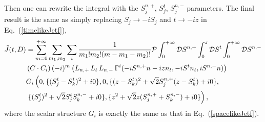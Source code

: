 \documentclass[a4paper,11pt]{article}
\begin{document}
Then one can rewrite the integral with the $S^{n,+}_{j}$, $S^{t}_j$, $S^{n,-}_j$ parameters. The final result is the same as simply replacing $S_{j} \rightarrow -i S_{j}$ and $t \rightarrow -i z$ in Eq.~(\ref{timelikeJetf}),
\begin{align}\label{timelikeJetfWR}
\tilde J(t,D)&=\sum_{m=0}^{+\infty} \sum_{m_1,m_2} \sum_{i} \frac{1}{m_1! m_2! (m-m_1-m_2)!} {\cal P} \int^{+ \infty}_{0} {\cal D} S^{n,+} \int^{z}_{0} {\cal D} S^{t} 
\int^{+\infty}_{0} {\cal D} S^{n,-} \nonumber\\
&\left(C \cdot C_{i}\right) (-i)^m \left(L_{n,+}\, L_{t} \, L_{n,-} \, \Gamma^{i}(-i S^{n,+} n - i z n_t,-i S^{t} n_t,i S^{n,-} n)\right) \nonumber\\ 
&G_{i}\left(0,\{(S^{t}_j-S^{t}_k)^2+i0\}, 0,
\{(z - S^{t}_k)^2+\sqrt{2} S^{n,+}_j (z-S^{t}_k)+i0\}, \right. \nonumber\\
& \left. \{(S^{t}_j)^2 + \sqrt{2} S^{t}_j S^{n,-}_k+i0\},\{z^2 + \sqrt{2} z (S^{n,+}_j + S^{n,-}_k)+i0\} \right),
\end{align}
where the scalar structure $G_i$ is exactly the same as that in Eq.~(\ref{spacelikeJetf}). 
\end{document}
